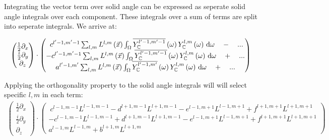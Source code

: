\documentclass[10pt]{scrartcl}
\begin{document}
Integrating the vector term over solid angle can be expressed as seperate solid angle integrals over each component. These integrals over a sum of terms are split into seperate integrals. We arrive at:

\begin{align*}
\begin{pmatrix}
\frac{1}{2}\partial_x\\
\frac{i}{2}\partial_y\\
\partial_z
\end{pmatrix}
\cdot
\begin{pmatrix}
\ c^{l'-1, m'-1}\sum_{l,m}{L^{l,m}\left(\vec{x}\right )\int_\Omega{\overline{Y_{\mathbb{C}}^{l'-1,m'-1}}\left(\omega\right)Y_{\mathbb{C}}^{l,m}\left(\omega\right)\,\mathrm{d}\omega}} \quad - \quad ...\\
-c^{l'-1, m'-1}\sum_{l,m}{L^{l,m}\left(\vec{x}\right )\int_\Omega{\overline{Y_{\mathbb{C}}^{l'-1,m'-1}}\left(\omega\right)Y_{\mathbb{C}}^{l,m}\left(\omega\right)\,\mathrm{d}\omega}} \quad + \quad ... \\
a^{l'-1, m'}\sum_{l,m}{L^{l,m}\left(\vec{x}\right )\int_\Omega{\overline{Y_{\mathbb{C}}^{l'-1,m'}}\left(\omega\right)Y_{\mathbb{C}}^{l,m}\left(\omega\right)\,\mathrm{d}\omega}} \quad + \quad ...
\end{pmatrix}
\end{align*}

Applying the orthogonality property to the solid angle integrals will will select specific $l,m$ in each term:
\begin{align*}
\begin{pmatrix}
\frac{1}{2}\partial_x\\
\frac{i}{2}\partial_y\\
\partial_z
\end{pmatrix}
\cdot
\begin{pmatrix}
\ c^{l-1, m-1}L^{l-1,m-1} - d^{l+1, m-1}L^{l+1,m-1} - e^{l-1, m+1}L^{l-1,m+1} + f^{l+1, m+1}L^{l+1,m+1}\\
-c^{l-1, m-1}L^{l-1,m-1} + d^{l+1, m-1}L^{l+1,m-1} - e^{l-1, m+1}L^{l-1,m+1} + f^{l+1, m+1}L^{l+1,m+1} \\
a^{l-1, m}L^{l-1,m}+b^{l+1, m}L^{l+1,m}
\end{pmatrix}
\end{align*}
\end{document}
